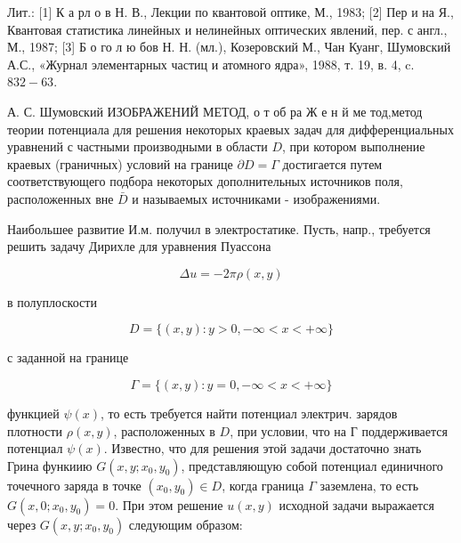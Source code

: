\documentclass[10pt]{article}
\begin{document}
Лит.: [1] К а рл о в Н. В., Лекции по квантовой оптике, М., 1983; [2] Пер и на Я., Квантовая статистика линейных и нелинейных оптических явлений, пер. с англ., М., 1987; [3] Б о го л ю бов Н. Н. (мл.), Козеровский М., Чан Куанг, Шумовский А.С., «Журнал элементарных частиц и атомного ядра», 1988, т. 19, в. 4, c. $832-63$.



А. С. Шумовский ИЗОБРАЖЕНИЙ МЕТОД, о т об ра Ж е н й ме тод,метод теории потенциала для решения некоторых краевых задач для дифференциальных уравнений с частными производными в области $D$, при котором выполнение краевых (граничных) условий на границе $\partial D=\Gamma$ достигается путем соответствующего подбора некоторых дополнительных источников поля, расположенных вне $\bar{D}$ и называемых источниками - изображениями.



Наибольшее развитие И.м. получил в электростатике. Пусть, напр., требуется решить задачу Дирихле для уравнения Пуассона



\[

\Delta u=-2 \pi \rho(x, y)

\]



в полуплоскости



\[

D=\{(x, y): y>0,-\infty<x<+\infty\}

\]



с заданной на границе



\[

\Gamma=\{(x, y): y=0,-\infty<x<+\infty\}

\]



функцией $\psi(x)$, то есть требуется найти потенциал электрич. зарядов плотности $\rho(x, y)$, расположенных в $D$, при условии, что на Г поддерживается потенциал $\psi(x)$. Известно, что для решения этой задачи достаточно знать Грина функиию $G\left(x, y ; x_{0}, y_{0}\right)$, представляющую собой потенциал единичного точечного заряда в точке $\left(x_{0}, y_{0}\right) \in D$, когда граница $\Gamma$ заземлена, то есть $G\left(x, 0 ; x_{0}, y_{0}\right)=0$. При этом решение $u(x, y)$ исходной задачи выражается через $G\left(x, y ; x_{0}, y_{0}\right)$ следующим образом:
\end{document}
